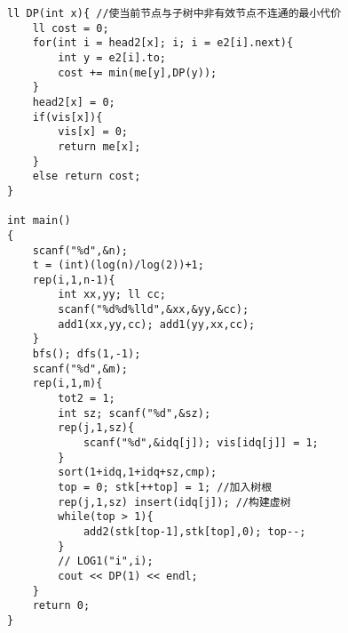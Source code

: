 \documentclass[twoside]{article}
\begin{document}
\begin{lstlisting}
ll DP(int x){ //使当前节点与子树中非有效节点不连通的最小代价
	ll cost = 0;
	for(int i = head2[x]; i; i = e2[i].next){
		int y = e2[i].to;
		cost += min(me[y],DP(y));
	}
	head2[x] = 0;
	if(vis[x]){
		vis[x] = 0;
		return me[x];
	} 
	else return cost;
}

int main()
{
	scanf("%d",&n);
	t = (int)(log(n)/log(2))+1;
	rep(i,1,n-1){
		int xx,yy; ll cc;
		scanf("%d%d%lld",&xx,&yy,&cc);
		add1(xx,yy,cc); add1(yy,xx,cc);
	}
	bfs(); dfs(1,-1);
	scanf("%d",&m);
	rep(i,1,m){
		tot2 = 1;
		int sz; scanf("%d",&sz);
		rep(j,1,sz){
			scanf("%d",&idq[j]); vis[idq[j]] = 1;
		}
		sort(1+idq,1+idq+sz,cmp);
		top = 0; stk[++top] = 1; //加入树根
		rep(j,1,sz) insert(idq[j]); //构建虚树
		while(top > 1){
			add2(stk[top-1],stk[top],0); top--;
		}
		// LOG1("i",i);
		cout << DP(1) << endl;
	}
	return 0;
}\end{lstlisting}
\end{document}
